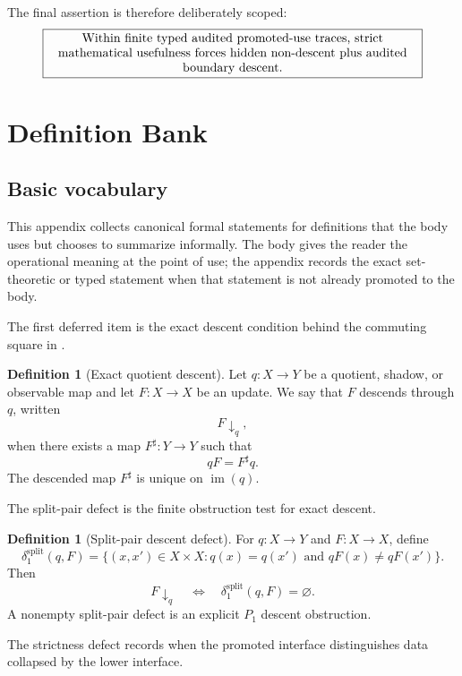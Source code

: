 \documentclass[11pt]{article}
\theoremstyle{definition}
\newtheorem{definition}[theorem]{Definition}
\begin{document}
The final assertion is therefore deliberately scoped:
\[
\boxed{\parbox{0.86\textwidth}{\centering
Within finite typed audited promoted-use traces, strict mathematical usefulness
forces hidden non-descent plus audited boundary descent.}}
\]
 
\appendix
\section{Definition Bank}\label{app:definitions}

\subsection{Basic vocabulary}
\label{appsubsec:definitions-basic-vocabulary}

This appendix collects canonical formal statements for definitions that the body
uses but chooses to summarize informally.  The body gives the reader the
operational meaning at the point of use; the appendix records the exact
set-theoretic or typed statement when that statement is not already promoted to
the body.

The first deferred item is the exact descent condition behind the commuting
square in .

\begin{definition}[Exact quotient descent]
\label{def:sau-exact-descent}
Let \(q:X\to Y\) be a quotient, shadow, or observable map and let \(F:X\to X\) be an update. We say that \(F\) descends through \(q\), written
\[
F\downarrow_q,
\]
when there exists a map \(F^\sharp:Y\to Y\) such that
\[
qF=F^\sharp q.
\]
The descended map \(F^\sharp\) is unique on \(\operatorname{im}(q)\).
\end{definition}

The split-pair defect is the finite obstruction test for exact descent.

\begin{definition}[Split-pair descent defect]
\label{def:sau-split-defect}
For \(q:X\to Y\) and \(F:X\to X\), define
\[
\delta^{\mathrm{split}}_1(q,F)
=
\{(x,x')\in X\times X:q(x)=q(x')\text{ and }qF(x)\neq qF(x')\}.
\]
Then
\[
F\downarrow_q
\quad\Longleftrightarrow\quad
\delta^{\mathrm{split}}_1(q,F)=\varnothing.
\]
A nonempty split-pair defect is an explicit \(P_1\) descent obstruction.
\end{definition}

The strictness defect records when the promoted interface distinguishes data
collapsed by the lower interface.
\end{document}
